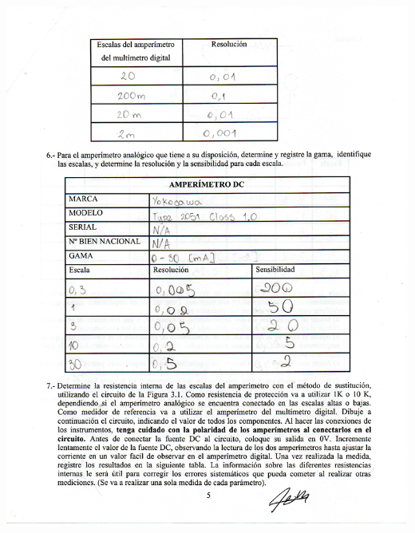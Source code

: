 \documentclass[12pt]{article}
\begin{document}
	\begin{center}
		\includegraphics[width=16cm,height=20cm]{Img/datos_lab_0002}
	\end{center}
	
\end{document}
